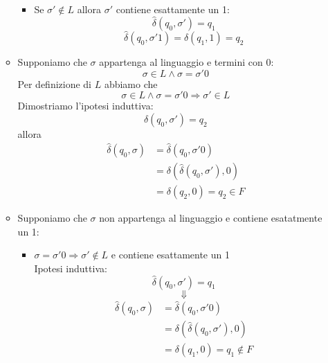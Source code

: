 \documentclass[a4paper]{article}
\begin{document}
\begin{example}
\begin{itemize}
\begin{itemize}
\begin{itemize}
            \item Se \( \sigma' \notin L \) allora \( \sigma' \) contiene esattamente un 1:
              \[
                \hat{\delta}(q_0, \sigma') = q_1
              \] 
              \[
                \hat{\delta}(q_0, \sigma'1) = \delta(q_1, 1) = q_2
              \] 
          \end{itemize}

        \item Supponiamo che \( \sigma  \) appartenga al linguaggio e termini con 0:
          \[
            \sigma \in L \wedge \sigma = \sigma'0
          \] 
          Per definizione di \( L \) abbiamo che
          \[
            \sigma \in L \wedge \sigma = \sigma'0 \Rightarrow \sigma' \in L
          \] 
          Dimostriamo l'ipotesi induttiva:
          \[
            \hat{\delta}(q_0, \sigma') = q_2
          \] 
          allora
          \[
            \begin{aligned}
              \hat{\delta}(q_0, \sigma) &= \hat{\delta}(q_0, \sigma'0)\\
                                        &= \delta(\hat{\delta}(q_0, \sigma'), 0)\\
                                        &= \delta(q_2, 0) = q_2 \in F
            \end{aligned}
          \] 

        \item Supponiamo che \( \sigma  \) non appartenga al linguaggio e contiene
          esatatmente un 1:
          \begin{itemize}
            \item \( \sigma  = \sigma'0 \Rightarrow \sigma' \notin L \) e contiene esattamente un 1\\
              \noindent
              Ipotesi induttiva:
              \[
                \hat{\delta}(q_0, \sigma') = q_1
              \] 
              \[
                \Downarrow
              \] 
              \[
                \begin{aligned}
                  \hat{\delta}(q_0, \sigma) &= \hat{\delta}(q_0, \sigma'0)\\
                                            &= \delta(\hat{\delta}(q_0, \sigma'), 0)\\
                                            &= \delta(q_1, 0) = q_1 \notin F
                \end{aligned}
              \] 


\end{itemize}
\end{itemize}
\end{itemize}
\end{example}
\end{document}
